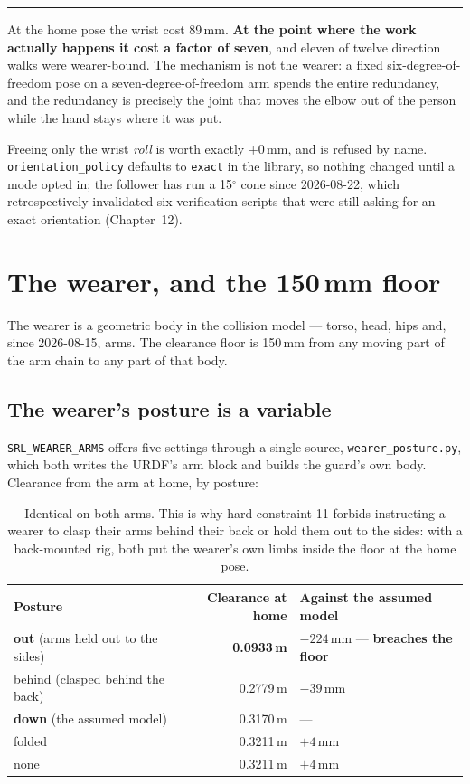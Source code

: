 \documentclass[11pt,a4paper,oneside]{report}
\newcommand{\code}[1]{\texttt{\small #1}}
\newcommand{\file}[1]{\texttt{\small #1}}
\newcommand{\dg}{$^{\circ}$}
\newcommand{\keyfact}[1]{%
  \par\vspace{7pt}\noindent
  \hspace*{0pt}\textcolor{srlblue}{\rule{2.5pt}{\dimexpr\baselineskip\relax}}%
  \hspace{9pt}%
  \begin{minipage}[t]{\dimexpr\textwidth-14pt\relax}
  \small #1
  \end{minipage}\par\vspace{7pt}}
\begin{document}
\keyfact{At the home pose the wrist cost 89\,mm. \textbf{At the point where the
work actually happens it cost a factor of seven}, and eleven of twelve
direction walks were wearer-bound. The mechanism is not the wearer: a fixed
six-degree-of-freedom pose on a seven-degree-of-freedom arm spends the entire
redundancy, and the redundancy is precisely the joint that moves the elbow out
of the person while the hand stays where it was put.}

Freeing only the wrist \emph{roll} is worth exactly $+0$\,mm, and is refused by
name. \code{orientation\_policy} defaults to \code{exact} in the library, so
nothing changed until a mode opted in; the follower has run a 15\dg{} cone
since 2026-08-22, which retrospectively invalidated six verification scripts
that were still asking for an exact orientation (Chapter~12).

\section{The wearer, and the 150\,mm floor}

The wearer is a geometric body in the collision model --- torso, head, hips
and, since 2026-08-15, arms. The clearance floor is 150\,mm from any moving
part of the arm chain to any part of that body.

\subsection{The wearer's posture is a variable}

\code{SRL\_WEARER\_ARMS} offers five settings through a single source,
\file{wearer\_posture.py}, which both writes the URDF's arm block and builds
the guard's own body. Clearance from the arm at home, by posture:

\begin{table}[H]
\centering
\small
\begin{tabular}{@{}lrl@{}}
\toprule
\textbf{Posture} & \textbf{Clearance at home} & \textbf{Against the assumed model} \\
\midrule
\textbf{out} (arms held out to the sides) & \textbf{0.0933\,m} & $-224$\,mm --- \textbf{breaches the floor} \\
behind (clasped behind the back) & 0.2779\,m & $-39$\,mm \\
\textbf{down} (the assumed model) & 0.3170\,m & --- \\
folded & 0.3211\,m & $+4$\,mm \\
none & 0.3211\,m & $+4$\,mm \\
\bottomrule
\end{tabular}
\caption{Identical on both arms. This is why hard constraint 11 forbids
instructing a wearer to clasp their arms behind their back or hold them out to
the sides: with a back-mounted rig, both put the wearer's own limbs inside the
floor at the home pose.}
\end{table}
\end{document}
